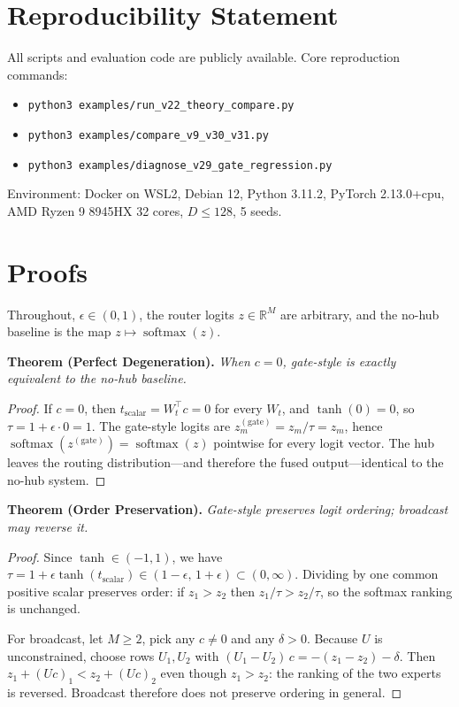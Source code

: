 \documentclass[10pt,twoside]{article}
\newcommand{\softmax}{\operatorname{softmax}}
\theoremstyle{definition}
\begin{document}
\section*{Reproducibility Statement}

All scripts and evaluation code are publicly available. Core reproduction commands:

\begin{itemize}
    \item \texttt{python3 examples/run\_v22\_theory\_compare.py}
    \item \texttt{python3 examples/compare\_v9\_v30\_v31.py}
    \item \texttt{python3 examples/diagnose\_v29\_gate\_regression.py}
\end{itemize}

Environment: Docker on WSL2, Debian 12, Python 3.11.2, PyTorch 2.13.0+cpu, AMD Ryzen 9 8945HX 32 cores, $D \leq 128$, 5 seeds.

\begin{ack}
\end{ack}




\appendix
\section{Proofs}
\label{app:proofs}

Throughout, $\epsilon \in (0,1)$, the router logits $z \in \mathbb{R}^M$ are arbitrary, and the no-hub baseline is the map $z \mapsto \softmax(z)$.

\medskip
\noindent\textbf{Theorem (Perfect Degeneration).} \emph{When $c = 0$, gate-style is exactly equivalent to the no-hub baseline.}

\begin{proof}
If $c = 0$, then $t_{\text{scalar}} = W_t^\top c = 0$ for every $W_t$, and $\tanh(0) = 0$, so $\tau = 1 + \epsilon \cdot 0 = 1$. The gate-style logits are $z_m^{(\text{gate})} = z_m / \tau = z_m$, hence $\softmax(z^{(\text{gate})}) = \softmax(z)$ pointwise for every logit vector. The hub leaves the routing distribution---and therefore the fused output---identical to the no-hub system.
\end{proof}

\medskip
\noindent\textbf{Theorem (Order Preservation).} \emph{Gate-style preserves logit ordering; broadcast may reverse it.}

\begin{proof}
Since $\tanh \in (-1, 1)$, we have $\tau = 1 + \epsilon \tanh(t_{\text{scalar}}) \in (1 - \epsilon,\, 1 + \epsilon) \subset (0, \infty)$. Dividing by one common positive scalar preserves order: if $z_1 > z_2$ then $z_1 / \tau > z_2 / \tau$, so the softmax ranking is unchanged.

For broadcast, let $M \geq 2$, pick any $c \neq 0$ and any $\delta > 0$. Because $U$ is unconstrained, choose rows $U_1, U_2$ with $(U_1 - U_2)\,c = -(z_1 - z_2) - \delta$. Then $z_1 + (Uc)_1 < z_2 + (Uc)_2$ even though $z_1 > z_2$: the ranking of the two experts is reversed. Broadcast therefore does not preserve ordering in general.
\end{proof}
\end{document}
